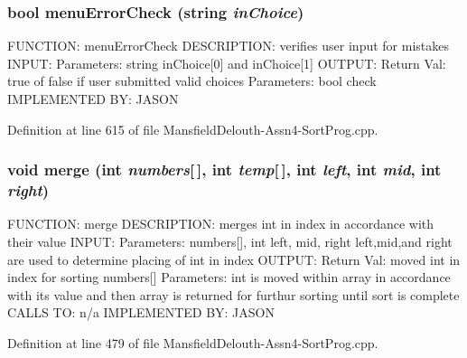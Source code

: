 \hypertarget{_mansfield_delouth-_assn4-_sort_prog_8cpp_a3fcd92b059e256a9f46866c6d1e2b1e4}{
\subsubsection[{menuErrorCheck}]{\setlength{\rightskip}{0pt plus 5cm}bool menuErrorCheck (string {\em inChoice})}}
\label{_mansfield_delouth-_assn4-_sort_prog_8cpp_a3fcd92b059e256a9f46866c6d1e2b1e4}
FUNCTION: menuErrorCheck DESCRIPTION: verifies user input for mistakes INPUT: Parameters: string inChoice\mbox{[}0\mbox{]} and inChoice\mbox{[}1\mbox{]} OUTPUT: Return Val: true of false if user submitted valid choices Parameters: bool check IMPLEMENTED BY: JASON 

Definition at line 615 of file MansfieldDelouth-\/Assn4-\/SortProg.cpp.

\hypertarget{_mansfield_delouth-_assn4-_sort_prog_8cpp_a22dd5c604dfcb67bc46bfd4bbb97d2f0}{
\subsubsection[{merge}]{\setlength{\rightskip}{0pt plus 5cm}void merge (int {\em numbers}\mbox{[}$\,$\mbox{]}, \/  int {\em temp}\mbox{[}$\,$\mbox{]}, \/  int {\em left}, \/  int {\em mid}, \/  int {\em right})}}
\label{_mansfield_delouth-_assn4-_sort_prog_8cpp_a22dd5c604dfcb67bc46bfd4bbb97d2f0}
FUNCTION: merge DESCRIPTION: merges int in index in accordance with their value INPUT: Parameters: numbers\mbox{[}\mbox{]}, int left, mid, right left,mid,and right are used to determine placing of int in index OUTPUT: Return Val: moved int in index for sorting numbers\mbox{[}\mbox{]} Parameters: int is moved within array in accordance with its value and then array is returned for furthur sorting until sort is complete CALLS TO: n/a IMPLEMENTED BY: JASON 

Definition at line 479 of file MansfieldDelouth-\/Assn4-\/SortProg.cpp.

